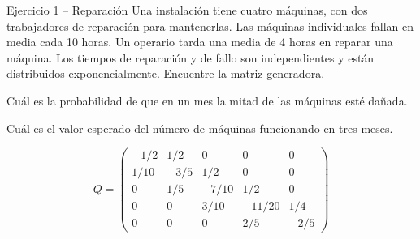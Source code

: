 \documentclass[aspectratio=1610, 9pt]{beamer}
\begin{document}
\begin{frame}{Ejercicio 1 -- Reparación}
\small
Una instalación tiene cuatro máquinas, con dos trabajadores de reparación para mantenerlas. Las máquinas individuales fallan en media cada 10 horas. Un operario tarda una media de 4 horas en reparar una máquina. Los tiempos de reparación y de fallo son independientes y están distribuidos exponencialmente. Encuentre la matriz generadora.

\medskip
Cuál es la probabilidad de que en un mes la mitad de las máquinas esté dañada.

Cuál es el valor esperado del número de máquinas funcionando en tres meses.

\[
Q = \begin{pmatrix}
 -1/2 & 1/2 & 0 & 0 & 0 \\
 1/10 & -3/5 & 1/2 & 0 & 0 \\
 0 & 1/5 & -7/10 & 1/2 & 0 \\
 0 & 0 & 3/10 & -11/20 & 1/4 \\
 0 & 0 & 0 & 2/5 & -2/5
\end{pmatrix}
\]
\end{frame}
\end{document}
